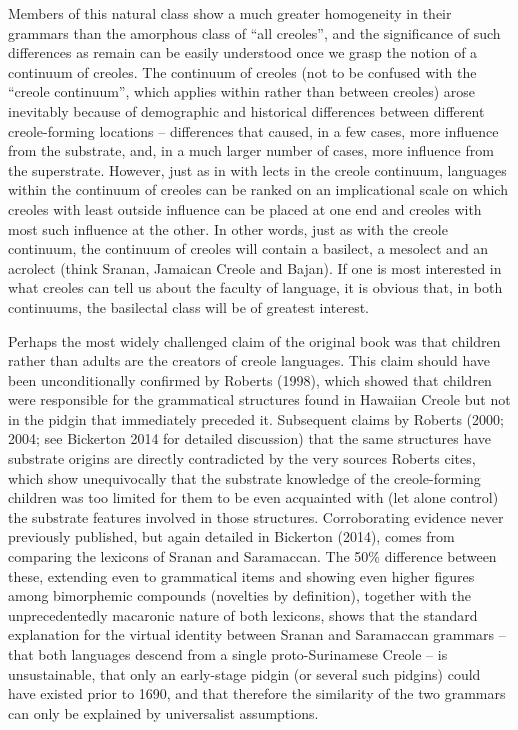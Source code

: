 \documentclass[letterpaper]{article}
\begin{document}
Members of this natural class show a much greater homogeneity in their grammars than the amorphous class of “all creoles”, and the significance of such differences as remain can be easily understood once we grasp the notion of a continuum of creoles.  The continuum of creoles (not to be confused with the “creole continuum”, which applies within rather than between creoles) arose inevitably because of demographic and historical differences between different creole-forming locations – differences that caused, in a few cases, more influence from the substrate, and, in a much larger number of cases, more influence from the superstrate.  However, just as in with lects in the creole continuum, languages within the continuum of creoles can be ranked on an implicational scale on which creoles with least outside influence can be placed at one end and creoles with most such influence at the other.  In other words, just as with the creole continuum, the continuum of creoles will contain a basilect, a mesolect and an acrolect (think Sranan, Jamaican Creole and Bajan).  If one is most interested in what creoles can tell us about the faculty of language, it is obvious that, in both continuums, the basilectal class will be of greatest interest.

Perhaps the most widely challenged claim of the original book was that children rather than adults are the creators of creole languages.  This claim should have been unconditionally confirmed by Roberts (1998), which showed that children were responsible for the grammatical structures found in Hawaiian Creole but not in the pidgin that immediately preceded it.  Subsequent claims by Roberts (2000; 2004; see Bickerton 2014 for detailed discussion) that the same structures have substrate origins are directly contradicted by the very sources Roberts cites, which show unequivocally that the substrate knowledge of the creole-forming children was too limited for them to be even acquainted with (let alone control) the substrate features involved in those structures.  Corroborating evidence never previously published, but again detailed in Bickerton (2014), comes from comparing the lexicons of Sranan and Saramaccan.  The 50\% difference between these, extending even to grammatical items and showing even higher figures among bimorphemic compounds (novelties by definition), together with the unprecedentedly macaronic nature of both lexicons, shows that the standard explanation for the virtual identity between Sranan and Saramaccan grammars –that both languages descend from a single proto-Surinamese Creole – is unsustainable, that only an early-stage pidgin (or several such pidgins) could have existed prior to 1690, and that therefore the similarity of the two grammars can only be explained by universalist assumptions. 
\end{document}
